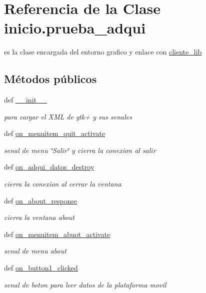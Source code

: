 \hypertarget{classinicio_1_1prueba__adqui}{
\section{Referencia de la Clase inicio.prueba\_\-adqui}
\label{classinicio_1_1prueba__adqui}
}


es la clase encargada del entorno grafico y enlace con \hyperlink{namespacecliente__lib}{cliente\_\-lib}  


\subsection*{Métodos públicos}
\begin{DoxyCompactItemize}
\item 
def \hyperlink{classinicio_1_1prueba__adqui_adab3c8bf1d5be6b8523065ccd474765a}{\_\-\_\-init\_\-\_\-}
\begin{DoxyCompactList}\small\item\em para cargar el XML de gtk+ y sus senales \end{DoxyCompactList}\item 
def \hyperlink{classinicio_1_1prueba__adqui_a8c6a3aea6c366d774c06bb10590997db}{on\_\-menuitem\_\-quit\_\-activate}
\begin{DoxyCompactList}\small\item\em senal de menu \char`\"{}Salir\char`\"{} y cierra la conexion al salir \end{DoxyCompactList}\item 
def \hyperlink{classinicio_1_1prueba__adqui_a7eab73096bb40a159687460826d5bfa7}{on\_\-adqui\_\-datos\_\-destroy}
\begin{DoxyCompactList}\small\item\em cierra la conexion al cerrar la ventana \end{DoxyCompactList}\item 
def \hyperlink{classinicio_1_1prueba__adqui_a29aff32a047ab1f8771d47f90fc8efb7}{on\_\-about\_\-response}
\begin{DoxyCompactList}\small\item\em cierra la ventana about \end{DoxyCompactList}\item 
def \hyperlink{classinicio_1_1prueba__adqui_ac5b1c3821f39cc144ef5b4f0236817a8}{on\_\-menuitem\_\-abuot\_\-activate}
\begin{DoxyCompactList}\small\item\em senal de menu about \end{DoxyCompactList}\item 
def \hyperlink{classinicio_1_1prueba__adqui_a3a6f8fec14c16dbb62dd3cbad2843669}{on\_\-button1\_\-clicked}
\begin{DoxyCompactList}\small\item\em senal de boton para leer datos de la plataforma movil \end{DoxyCompactList}\end{DoxyCompactItemize}
